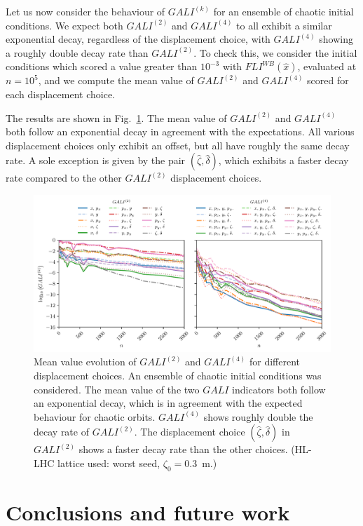 Let us now consider the behaviour of $GALI^{(k)}$ for an ensemble of chaotic initial conditions. We expect both $GALI^{(2)}$ and $GALI^{(4)}$ to all exhibit a similar exponential decay, regardless of the displacement choice, with $GALI^{(4)}$ showing a roughly double decay rate than $GALI^{(2)}$. To check this, we consider the initial conditions which scored a value greater than $10^{-3}$ with $FLI^{WB}(\hat{x})$, evaluated at $n=10^{5}$, and we compute the mean value of $GALI^{(2)}$ and $GALI^{(4)}$ scored for each displacement choice.

The results are shown in Fig.~\ref{fig:gali2_4_chaos}. The mean value of $GALI^{(2)}$ and $GALI^{(4)}$ both follow an exponential decay in agreement with the expectations. All various displacement choices only exhibit an offset, but all have roughly the same decay rate. A sole exception is given by the pair $(\hat{\zeta}, \hat{\delta})$, which exhibits a faster decay rate compared to the other $GALI^{(2)}$ displacement choices.  

\begin{figure}
    \centering
    \includegraphics[width=1.0\textwidth]{6_lhc_dynamic_indicators/figs/gali_2_4_chaos.pdf}
    \caption{Mean value evolution of $GALI^{(2)}$ and $GALI^{(4)}$ for different displacement choices. An ensemble of chaotic initial conditions was considered. The mean value of the two $GALI$ indicators both follow an exponential decay, which is in agreement with the expected behaviour for chaotic orbits. $GALI^{(4)}$ shows roughly double the decay rate of $GALI^{(2)}$. The displacement choice $(\hat{\zeta}, \hat{\delta})$ in $GALI^{(2)}$ shows a faster decay rate than the other choices. (HL-LHC lattice used: worst seed, $\zeta_0=$\SI{0.3}{\meter}.)}
    \label{fig:gali2_4_chaos}
\end{figure}


\section{Conclusions and future work}

